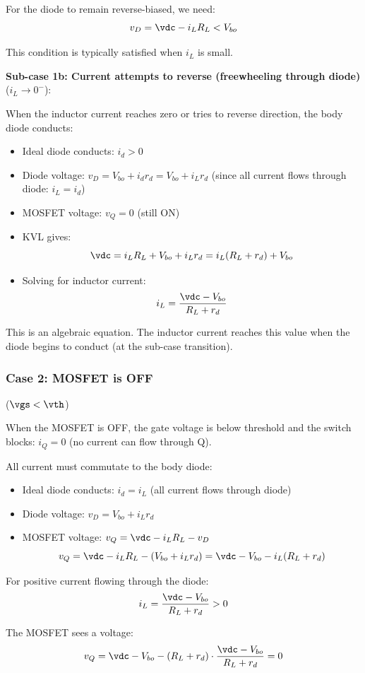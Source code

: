 For the diode to remain reverse-biased, we need:
\[
    v_D = \vdc - i_L R_L < V_{bo}
\]

This condition is typically satisfied when $i_L$ is small.

\textbf{Sub-case 1b: Current attempts to reverse (freewheeling through diode)} ($i_L \to 0^-$):

When the inductor current reaches zero or tries to reverse direction, the body diode conducts:
\begin{itemize}
    \item Ideal diode conducts: $i_d > 0$
    \item Diode voltage: $v_D = V_{bo} + i_d r_d = V_{bo} + i_L r_d$ (since all current flows through diode: $i_L = i_d$)
    \item MOSFET voltage: $v_Q = 0$ (still ON)
    \item KVL gives:
    \[
        \vdc = i_L R_L + V_{bo} + i_L r_d = i_L(R_L + r_d) + V_{bo}
    \]
    \item Solving for inductor current:
    \[
        i_L = \frac{\vdc - V_{bo}}{R_L + r_d}
    \]
\end{itemize}

This is an algebraic equation. The inductor current reaches this value when the diode begins to conduct (at the sub-case transition).

\subsubsection{Case 2: MOSFET is OFF} ($\vgs < \vth$)

When the MOSFET is OFF, the gate voltage is below threshold and the switch blocks: $i_Q = 0$ (no current can flow through Q).

All current must commutate to the body diode:
\begin{itemize}
    \item Ideal diode conducts: $i_d = i_L$ (all current flows through diode)
    \item Diode voltage: $v_D = V_{bo} + i_L r_d$
    \item MOSFET voltage: $v_Q = \vdc - i_L R_L - v_D$
    \[
        v_Q = \vdc - i_L R_L - (V_{bo} + i_L r_d) = \vdc - V_{bo} - i_L(R_L + r_d)
    \]
\end{itemize}

For positive current flowing through the diode:
\[
    i_L = \frac{\vdc - V_{bo}}{R_L + r_d} > 0
\]

The MOSFET sees a voltage:
\[
    v_Q = \vdc - V_{bo} - (R_L + r_d) \cdot \frac{\vdc - V_{bo}}{R_L + r_d} = 0
\]

